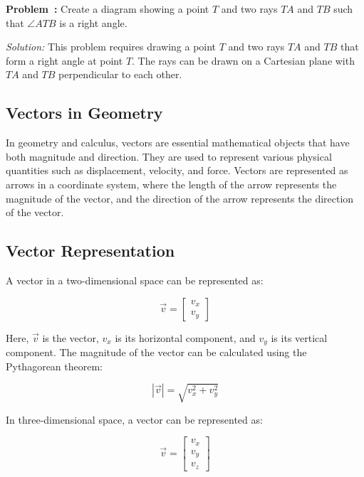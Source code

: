 \documentclass[a4paper,12pt]{book}
\newcounter{problem}
\newenvironment{problem}[1][\theproblem]
{\refstepcounter{problem}\par\medskip\noindent\textbf{Problem~#1:} \rmfamily}{\medskip}
\newenvironment{solution}[1][]
{\par\noindent\textit{Solution:} \rmfamily}{\medskip}
\begin{document}
\begin{problem}
Create a diagram showing a point \( T \) and two rays \( TA \) and \( TB \) such that \( \angle ATB \) is a right angle.
\end{problem}

\begin{solution}
This problem requires drawing a point \( T \) and two rays \( TA \) and \( TB \) that form a right angle at point \( T \). The rays can be drawn on a Cartesian plane with \( TA \) and \( TB \) perpendicular to each other.
\end{solution}



\subsection{Vectors in Geometry}
\label{subsec:vectors_in_geometry}

In geometry and calculus, vectors are essential mathematical objects that have both magnitude and direction. They are used to represent various physical quantities such as displacement, velocity, and force. Vectors are represented as arrows in a coordinate system, where the length of the arrow represents the magnitude of the vector, and the direction of the arrow represents the direction of the vector.

\subsection{Vector Representation}

A vector in a two-dimensional space can be represented as:

\[
\vec{v} = \begin{bmatrix}
v_x \\
v_y
\end{bmatrix}
\]

Here, $\vec{v}$ is the vector, $v_x$ is its horizontal component, and $v_y$ is its vertical component. The magnitude of the vector can be calculated using the Pythagorean theorem:

\[
|\vec{v}| = \sqrt{v_x^2 + v_y^2}
\]

In three-dimensional space, a vector can be represented as:

\[
\vec{v} = \begin{bmatrix}
v_x \\
v_y \\
v_z
\end{bmatrix}
\]
\end{document}
